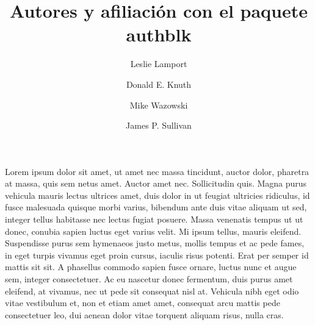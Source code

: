 \documentclass[12pt,letterpaper]{article}
\title{Autores y afiliación con el paquete authblk}
\author[1]{Leslie Lamport}
\author[1]{Donald E. Knuth}
\author[2]{Mike Wazowski}
\author[2]{James P.  Sullivan}
\affil[1]{Department of Computer Science, \LaTeX\ University}
\affil[2]{Department of Mechanical Engineering, Monsters University}
\begin{document}
\maketitle
Lorem ipsum dolor sit amet, ut amet nec massa tincidunt, auctor dolor, pharetra at massa, quis sem netus amet. Auctor amet nec. Sollicitudin quis. Magna purus vehicula mauris lectus ultrices amet, duis dolor in ut feugiat ultricies ridiculus, id fusce malesuada quisque morbi varius, bibendum ante duis vitae aliquam ut sed, integer tellus habitasse nec lectus fugiat posuere. Massa venenatis tempus ut ut donec, conubia sapien luctus eget varius velit. Mi ipsum tellus, mauris eleifend. Suspendisse purus sem hymenaeos justo metus, mollis tempus et ac pede fames, in eget turpis vivamus eget proin cursus, iaculis risus potenti. Erat per semper id mattis sit sit. A phasellus commodo sapien fusce ornare, luctus nunc et augue sem, integer consectetuer. Ac eu nascetur donec fermentum, duis purus amet eleifend, at vivamus, nec ut pede sit consequat nisl at. Vehicula nibh eget odio vitae vestibulum et, non et etiam amet amet, consequat arcu mattis pede consectetuer leo, dui aenean dolor vitae torquent aliquam risus, nulla cras.
\end{document}
